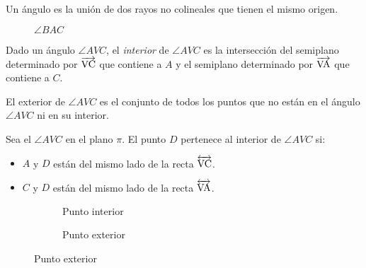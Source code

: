 \begin{definition}
Un ángulo es la unión de dos rayos no colineales que tienen el mismo origen.

\begin{figure}[!h]
    \centering
    
    \label{fig:angle}
    \caption{$\angle{BAC}$}
\end{figure}

\end{definition}

\begin{definition}
Dado un ángulo $\angle{AVC}$, el \textit{interior} de $\angle{AVC}$ es la intersección del semiplano determinado por $\overrightarrow{\rm VC}$ que contiene a $A$ y el semiplano determinado por $\overrightarrow{\rm VA}$ que contiene a $C$.

\end{definition}

\begin{definition}
El exterior de $\angle{AVC}$ es el conjunto de todos los puntos que no están en el ángulo $\angle{AVC}$ ni en su interior.
\end{definition}
    
\begin{definition}
Sea el $\angle{AVC}$ en el plano $\pi$. El punto $D$ pertenece al interior de $\angle{AVC}$ si:

\begin{itemize}
    \item $A$ y $D$ están del mismo lado de la recta $\overleftrightarrow{\rm VC}$.
    \item $C$ y $D$ están del mismo lado de la recta $\overleftrightarrow{\rm VA}$.
\end{itemize}

\begin{figure}[h!]
    \centering
    \begin{subfigure}[b]{.5\textwidth}
        \centering
        
        \caption{Punto interior}
        \label{fig:ang-interior}
    \end{subfigure}%
    \begin{subfigure}[b]{.5\textwidth}
        \centering
        
        \caption{Punto exterior}
        \label{fig:ang-exterior}
    \end{subfigure}
    \centering
    \label{fig:ang-int-ext}
\end{figure}    

\end{definition}

